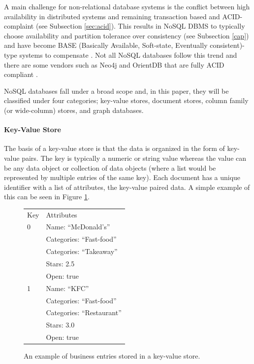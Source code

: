 A main challenge for non-relational database systems is the conflict between high availability in distributed systems and remaining transaction based and ACID-complaint (see Subsection \ref{sec:acid}). This results in NoSQL DBMS to typically choose availability and partition tolerance over consistency (see Subsection \ref{cap}) and have become BASE (Basically Available, Soft-state, Eventually consistent)-type systems to compensate \cite{base}. Not all NoSQL databases follow this trend and there are some vendors such as Neo4j and OrientDB that are fully ACID compliant \cite{acid}.

NoSQL databases fall under a broad scope and, in this paper, they will be classified under four categories; key-value stores, document stores, column family (or wide-column) stores, and graph databases.

\paragraph{Key-Value Store}

The basis of a key-value store is that the data is organized in the form of key-value pairs. The key is typically a numeric or string value whereas the value can be any data object or collection of data objects (where a list would be represented by multiple entries of the same key). Each document has a unique identifier with a list of attributes, the key-value paired data. A simple example of this can be seen in Figure \ref{fig:keyvalue}.

\begin{figure}[h]
    \centering
    \begin{tabular}{ |p{2cm}|p{4cm}|}
        \hline
        \rowcolor{Gray}
        \multicolumn{2}{|c|}{Businesses} \\
        \hline
        \rowcolor{LightGray}
        Key & Attributes                 \\
        \hline
        0   & Name: ``McDonald's''       \\
            & Categories: ``Fast-food''  \\
            & Categories: ``Takeaway''   \\
            & Stars: 2.5                 \\
            & Open: true                 \\
        \hline
        1   & Name: ``KFC''              \\
            & Categories: ``Fast-food''  \\
            & Categories: ``Restaurant'' \\
            & Stars: 3.0                 \\
            & Open: true                 \\
        \hline
    \end{tabular}
    \vspace*{5mm}
    \caption{An example of business entries stored in a key-value store.}
    \label{fig:keyvalue}
\end{figure}

